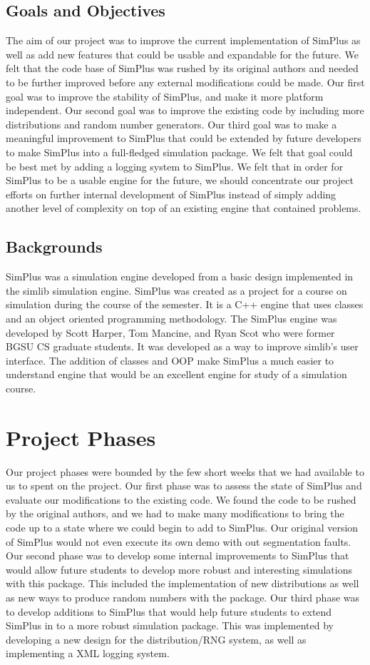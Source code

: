 \documentclass[12pt]{report}
\newcommand{\mychapter}[1]{\chapter{#1} \label{ch:#1} \thispagestyle{fancy}}
\begin{document}
\section{Goals and Objectives}
	The aim of our project was to improve the current implementation of SimPlus as well as add new features that could be usable and expandable for the future.  We felt that the code base of SimPlus was rushed by its original authors and needed to be further improved before any external modifications could be made.  Our first goal was to improve the stability of SimPlus, and make it more platform independent.  Our second goal was to improve the existing code by including more distributions and random number generators.  Our third goal was to make a meaningful improvement to SimPlus that could be extended by future developers to make SimPlus into a full-fledged simulation package.  We felt that goal could be best met by adding a logging system to SimPlus.  We felt that in order for SimPlus to be a usable engine for the future, we should concentrate our project efforts on further internal development of SimPlus instead of simply adding another level of complexity on top of an existing engine that contained problems.

\section{Backgrounds}
	SimPlus was a simulation engine developed from a basic design implemented in the simlib simulation engine.  SimPlus was created as a project for a course on simulation during the course of the semester.  It is a C++ engine that uses classes and an object oriented programming methodology.  The SimPlus engine was developed by Scott Harper, Tom Mancine, and Ryan Scot who were former BGSU CS graduate students.  It was developed as a way to improve simlib's user interface.  The addition of classes and OOP make SimPlus a much easier to understand engine that would be an excellent engine for study of a simulation course.

\mychapter{Project Phases}
	Our project phases were bounded by the few short weeks that we had available to us to spent on the project.  Our first phase was to assess the state of SimPlus and evaluate our modifications to the existing code.  We found the code to be rushed by the original authors, and we had to make many modifications to bring the code up to a state where we could begin to add to SimPlus.  Our original version of SimPlus would not even execute its own demo with out segmentation faults.  Our second phase was to develop some internal improvements to SimPlus that would allow future students to develop more robust and interesting simulations with this package.  This included the implementation of new distributions as well as new ways to produce random numbers with the package.  Our third phase was to develop additions to SimPlus that would help future students to extend SimPlus in to a more robust simulation package.  This was implemented by developing a new design for the distribution/RNG system, as well as implementing a XML logging system.
\end{document}
